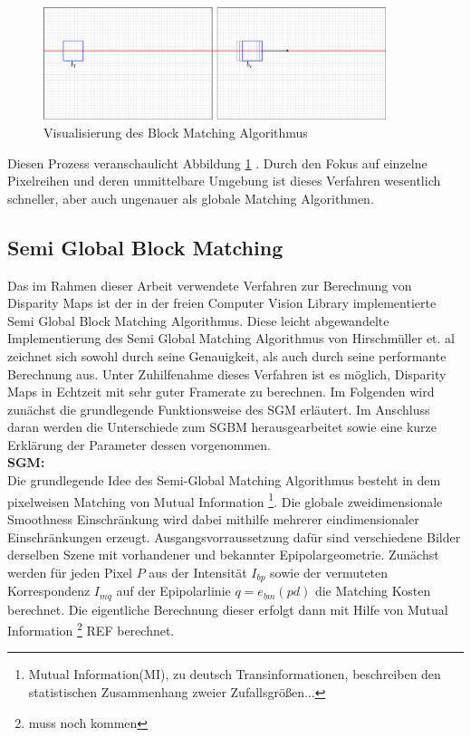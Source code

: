 \begin{figure}[h]
	\begin{center}
		\includegraphics[width=10cm]{img/block_matching.pdf}
	\end{center}
	\caption{Visualisierung des Block Matching Algorithmus}
	\label{fig:block_matching}
\end{figure}

\noindent
Diesen Prozess veranschaulicht Abbildung \ref{fig:block_matching} . Durch den Fokus auf einzelne Pixelreihen und deren unmittelbare Umgebung ist dieses Verfahren wesentlich schneller, aber auch ungenauer als globale Matching Algorithmen. 
 


\subsection{Semi Global Block Matching}
\label{subsec:stereo_matching_sgbm}
Das im Rahmen dieser Arbeit verwendete Verfahren zur Berechnung von Disparity Maps ist der in der freien Computer Vision Library implementierte Semi Global Block Matching Algorithmus. Diese leicht abgewandelte Implementierung des Semi Global Matching Algorithmus von Hirschmüller et. al \cite{hirschmuller2005sgm} zeichnet sich sowohl durch seine Genauigkeit, als auch durch seine performante Berechnung aus. Unter Zuhilfenahme dieses Verfahren ist es möglich, Disparity Maps in Echtzeit mit sehr guter Framerate zu berechnen. Im Folgenden wird zunächst die grundlegende Funktionsweise des SGM erläutert. Im Anschluss daran werden die Unterschiede zum SGBM herausgearbeitet sowie eine kurze Erklärung der Parameter dessen vorgenommen.\\

\noindent
\textbf{SGM:} \\
Die grundlegende Idee des Semi-Global Matching Algorithmus besteht in dem pixelweisen Matching von Mutual Information \footnote{Mutual Information(MI), zu deutsch Transinformationen, beschreiben den statistischen Zusammenhang zweier Zufallsgrößen...}. Die globale zweidimensionale Smoothness Einschränkung wird dabei mithilfe mehrerer eindimensionaler Einschränkungen erzeugt. Ausgangsvorraussetzung dafür sind verschiedene Bilder derselben Szene mit vorhandener und bekannter Epipolargeometrie. 
Zunächst werden für jeden Pixel $P$ aus der Intensität $I_{bp}$ sowie der vermuteten Korrespondenz $I_{mq}$ auf der Epipolarlinie $q=e_{bm}(pd)$ die Matching Kosten berechnet. Die eigentliche Berechnung dieser erfolgt dann mit Hilfe von Mutual Information \footnote{muss noch kommen} REF berechnet.

